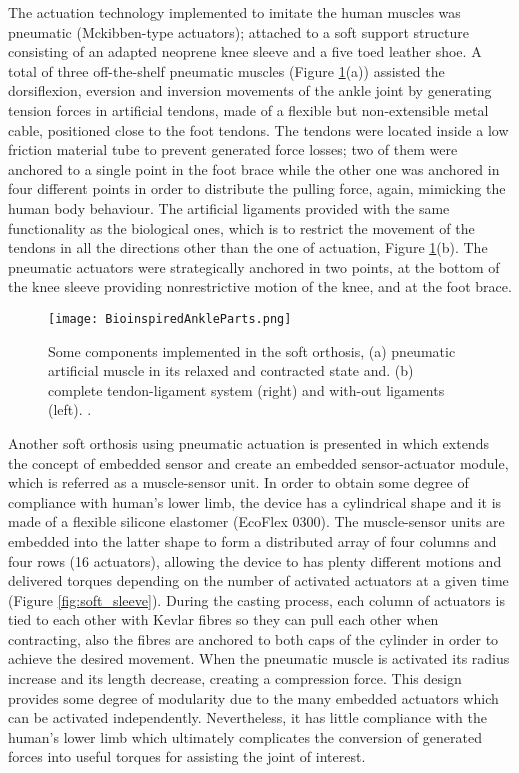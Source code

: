 The actuation technology implemented to imitate the human muscles was pneumatic (Mckibben-type actuators); attached to a soft support structure consisting of an adapted neoprene knee sleeve and a five toed leather shoe. A total of three off-the-shelf pneumatic muscles (Figure \ref{fig:bio_ankle_parts}(a)) assisted the dorsiflexion, eversion and inversion movements of the ankle joint by generating tension forces in artificial tendons, made of a flexible but non-extensible metal cable, positioned close to the foot tendons. The tendons were located inside a low friction material tube to prevent generated force losses; two of them were anchored to a single point in the foot brace while the other one was anchored in four different points in order to distribute the pulling force, again, mimicking the human body behaviour. The artificial ligaments provided with the same functionality as the biological ones, which is to restrict the movement of the tendons in all the directions other than the one of actuation, Figure \ref{fig:bio_ankle_parts}(b). The pneumatic actuators were strategically anchored in two points, at the bottom of the knee sleeve providing nonrestrictive motion of the knee, and at the foot brace.

\begin{figure}[hb!]
    \centering
    \texttt{[image: BioinspiredAnkleParts.png]}
    \caption{Some components implemented in the soft orthosis, (a) pneumatic artificial muscle in its relaxed and contracted state and. (b) complete tendon-ligament system (right) and with-out ligaments (left). \cite{park2011bio}. }
    \label{fig:bio_ankle_parts}
\end{figure}

Another soft orthosis using pneumatic actuation is presented in \cite{Park2012} which extends the concept of embedded sensor and create an embedded sensor-actuator module, which is referred as a muscle-sensor unit. In order to obtain some degree of compliance with human’s lower limb, the device has a cylindrical shape and it is made of a flexible silicone elastomer (EcoFlex 0300). The muscle-sensor units are embedded into the latter shape to form a distributed array of four columns and four rows (16 actuators), allowing the device to has plenty different motions and delivered torques depending on the number of activated actuators at a given time (Figure \ref{fig:soft_sleeve}). During the casting process, each column of actuators is tied to each other with Kevlar fibres so they can pull each other when contracting, also the fibres are anchored to both caps of the cylinder in order to achieve the desired movement. When the pneumatic muscle is activated its radius increase and its length decrease, creating a compression force. This design provides some degree of modularity due to the many embedded actuators which can be activated independently. Nevertheless, it has little compliance with the human’s lower limb which ultimately complicates the conversion of generated forces into useful torques for assisting the joint of interest.

